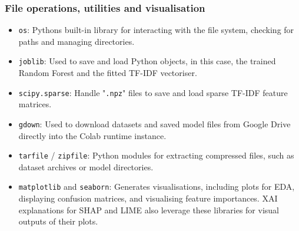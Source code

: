 
\subsubsection*{File operations, utilities and visualisation}

\begin{itemize}
  \item \texttt{os}: Pythons built-in library for interacting with the file system, checking for paths and managing directories.
  \item \texttt{joblib}: Used to save and load Python objects, in this case, the trained Random Forest and the fitted TF-IDF vectoriser.
  \item \texttt{scipy.sparse}: Handle "\texttt{.npz}" files to save and load sparse TF-IDF feature matrices.
  \item \texttt{gdown}: Used to download datasets and saved model files from Google Drive directly into the Colab runtime instance.
  \item \texttt{tarfile} / \texttt{zipfile}: Python modules for extracting compressed files, such as dataset archives or model directories.
  \item \texttt{matplotlib} and \texttt{seaborn}: Generates visualisations, including plots for EDA, displaying confusion matrices, and visualising feature importances. XAI explanations for SHAP and LIME also leverage these libraries for visual outputs of their plots.
\end{itemize}
